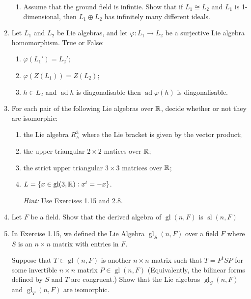 \documentclass[12pt,a4paper]{report}
\newcommand{\GL}{\operatorname{gl}}
\newcommand{\SL}{\operatorname{sl}}
\newcommand{\AD}{\operatorname{ad}}
\begin{document}
\begin{enumerate}[label=2.\arabic*]
\begin{enumerate}[label=(\roman*)]
	\item Assume that the ground field is infintie.  Show that if $L_1 \cong L_2$ and  $L_1$ is 1-dimensional, then $L_1\oplus L_2$ has infinitely many different ideals.

\end{enumerate}

\item Let $L_1$ and $L_2$ be Lie algebras, and let $\varphi : L_1\to L_2$ be a surjective Lie algebra homomorphism.  True or False:
\begin{enumerate}[label=(\alph*)]

	\item $\varphi(L_1') = L_2'$;
	
	\item $\varphi(Z(L_1))=Z(L_2)$;
	
	\item $h \in L_2$ and $\AD h$ is diagonalisable then $\AD \varphi(h)$ is diagonalisable.

\end{enumerate}

\item For each pair of the following Lie algebras over $\mathbb{R}$, decide whether or not they are isomorphic:
\begin{enumerate}[label=(\roman*)]

	\item the Lie algebra $R_\wedge^3$ where the Lie bracket is given by the vector product;
	
	\item the upper triangular $2 \times 2$ matices over $\mathbb{R}$;
	
	\item the strict upper triangular $3 \times 3$ matrices over $\mathbb{R}$;
	
	\item $L=\{ x \in \GL(3,\R):x^t=-x\}$.
	
	\textit{Hint:} Use Exercises 1.15 and 2.8.

\end{enumerate}

\item Let $F$ be a field.  Show that the derived algebra of $\GL(n,F)$ is $\SL(n,F)$

\item In Exercise 1.15, we defined the Lie Algebra $\GL_S(n,F)$ over a field $F$ where $S$ is an $n\times n$ matrix with entries in $F$.

Suppose that $T \in \GL(n,F)$ is another $n\times n$ matrix such that $T=P^tSP$ for some invertible $n\times n$ matrix $P\in \GL(n,F)$  (Equivalently, the bilinear forms defined by $S$ and $T$ are congruent.)  Show that the Lie algebras $\GL_S(n,F)$ and $\GL_T(n,F)$ are isomorphic.


\end{enumerate}
\end{document}
